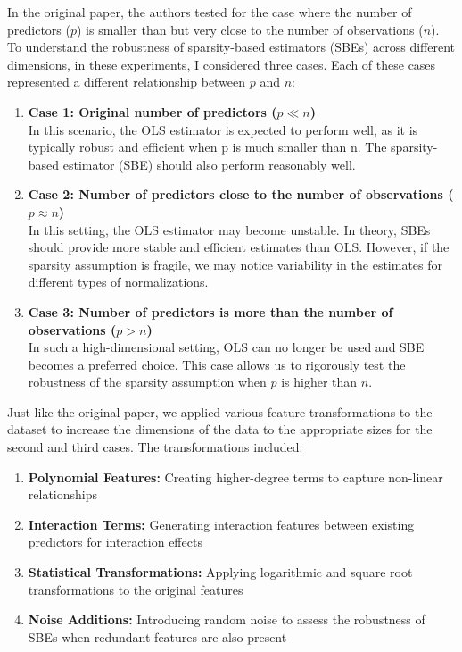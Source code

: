 In the original paper, the authors tested for the case where the number of predictors ($p$) is smaller than but very close to the number of observations ($n$). To understand the robustness of sparsity-based estimators (SBEs) across different dimensions, in these experiments, I considered three cases. Each of these cases represented a different relationship between $p$ and $n$: 
\begin{enumerate}
        \item \textbf{Case 1: Original number of predictors ($p \ll n$)}\\
        In this scenario, the OLS estimator is expected to perform well, as it is typically robust and efficient when p is much smaller than n. The sparsity-based estimator (SBE) should also perform reasonably well. 
        \item \textbf{Case 2: Number of predictors close to the number of observations ($p \approx n$)}\\
        In this setting, the OLS estimator may become unstable. In theory, SBEs should provide more stable and efficient estimates than OLS. However, if the sparsity assumption is fragile, we may notice variability in the estimates for different types of normalizations. 
        \item \textbf{Case 3: Number of predictors is more than the number of observations ($p > n$)}\\
        In such a high-dimensional setting, OLS can no longer be used and SBE becomes a preferred choice. This case allows us to rigorously test the robustness of the sparsity assumption when $p$ is higher than $n$. 
    \end{enumerate}

Just like the original paper, we applied various feature transformations to the dataset to increase the dimensions of the data to the appropriate sizes for the second and third cases. The  transformations included:
\begin{enumerate}
    \item \textbf{Polynomial Features:} Creating higher-degree terms to capture non-linear relationships
    \item \textbf{Interaction Terms:} Generating interaction features between existing predictors for interaction effects
    \item \textbf{Statistical Transformations:} Applying logarithmic and square root transformations to the original features
    \item \textbf{Noise Additions:} Introducing random noise to assess the robustness of SBEs when redundant features are also present
\end{enumerate}\\


